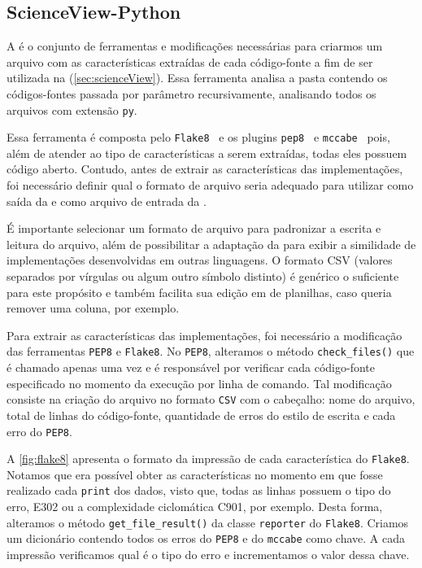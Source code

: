 		\subsection{ScienceView-Python}
		\label{sec:scienceView-Python}

			A  é o conjunto de ferramentas e modificações
			necessárias para criarmos um arquivo com as características extraídas de
			cada código-fonte a fim de ser utilizada na  (\cref{sec:scienceView}).
			Essa ferramenta analisa a pasta contendo os códigos-fontes passada por
			parâmetro recursivamente, analisando todos os arquivos com extensão
			\texttt{py}.
			
			Essa ferramenta é composta pelo \texttt{Flake8}~\cite{flake8} e os plugins
			\texttt{pep8}~\cite{pep8} e \texttt{mccabe}~\cite{mccabe2013} pois, além de atender ao tipo
			de características a serem extraídas, todas eles possuem código aberto. Contudo,
			antes de extrair as características das implementações, foi necessário definir
			qual o formato de arquivo seria adequado para utilizar como saída da
			 e como arquivo de entrada da .

			É importante selecionar um formato de arquivo para padronizar a escrita
			e leitura do arquivo, além de possibilitar a adaptação da 
			para exibir a similidade de implementações desenvolvidas em outras linguagens.
			O formato CSV (valores separados por vírgulas ou algum outro símbolo distinto)
			é genérico o suficiente para este propósito e também facilita sua edição em 
			de planilhas, caso queria remover uma coluna, por exemplo.
			
			Para extrair as características das implementações, foi necessário a modificação
			das ferramentas \texttt{PEP8} e \texttt{Flake8}. No \texttt{PEP8}, alteramos o
			método \texttt{check\_files()} que é chamado apenas uma vez e é responsável por
			verificar cada código-fonte especificado no momento da execução por linha de
			comando. Tal modificação consiste na criação do arquivo no formato \texttt{CSV}
			com o cabeçalho: nome do arquivo, total de linhas do código-fonte, quantidade
			de erros do estilo de escrita e cada erro do \texttt{PEP8}.
				
			A \cref{fig:flake8} apresenta o formato da impressão de cada característica do
			\texttt{Flake8}. Notamos que era possível obter as características no momento em
			que fosse realizado cada \texttt{print} dos dados, visto que, todas as linhas
			possuem o tipo do erro, E302 ou a complexidade ciclomática C901, por exemplo.
			Desta forma, alteramos o método \texttt{get\_file\_result()} da classe
			\texttt{reporter} do \texttt{Flake8}. Criamos um dicionário contendo todos os
			erros do \texttt{PEP8} e do \texttt{mccabe} como chave. A cada impressão
			verificamos qual é o tipo do erro e incrementamos o valor dessa chave.
	
